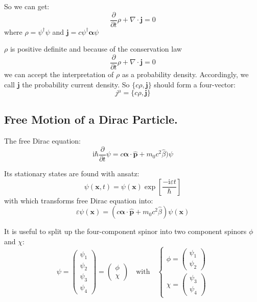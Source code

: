 So we can get:
\begin{equation}
\frac{\partial}{\partial t} \rho + \nabla \cdot \bm{j} = 0
\end{equation}
where $\rho = \psi^\dagger \psi$ and $\bm{j} = c \psi^\dagger \bm{\alpha} \psi$

$\rho$ is positive definite and because of the conservation law
\begin{equation}
\frac{\partial}{\partial t} \rho + \nabla \cdot \bm{j} = 0
\end{equation}
we can accept the interpretation of $\rho$ as a probability density. Accordingly, we call $\bm{j}$ the probability current density.
So $\{c\rho, \bm{j}\}$ should form a four-vector:
\begin{equation}
j^\mu = \{c\rho, \bm{j}\}
\end{equation}

\subsection{Free Motion of a Dirac Particle.}

The free Dirac equation:
\begin{equation}
\mathrm{i}\hbar \frac{\partial}{\partial t} \psi = c \bm{\alpha} \cdot \hat{\bm{p}} + m_0 c^2 \hat{\beta} ) \psi
\end{equation}

Its stationary states are found with ansatz:
\begin{equation}
\psi(\bm{x}, t) = \psi(\bm{x}) \exp\left[ \frac{-\mathrm{i} \varepsilon t}{\hbar} \right]
\end{equation}
with which transforms free Dirac equation into:
\begin{equation}
\varepsilon \psi(\bm{x}) = (c \bm{\alpha} \cdot \hat{\bm{p}} + m_0 c^2 \hat{\beta}) \psi(\bm{x})
\end{equation}

It is useful to split up the four-component spinor into two component spinors $\phi$ and $\chi$:
\begin{equation}
\psi = \begin{pmatrix} \psi_1 \\ \psi_2 \\ \psi_3 \\ \psi_4 \end{pmatrix} = \begin{pmatrix} \phi \\ \chi \end{pmatrix} \quad \text{with} \quad \begin{cases} \phi = \begin{pmatrix} \psi_1 \\ \psi_2 \end{pmatrix} \\ \chi = \begin{pmatrix} \psi_3 \\ \psi_4 \end{pmatrix} \end{cases}
\end{equation}

